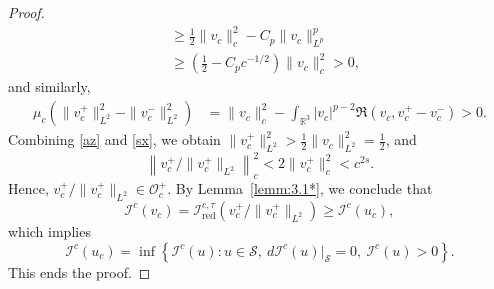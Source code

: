 \documentclass{amsart}
\theoremstyle{plain}
\theoremstyle{definition}
\theoremstyle{remark}
\numberwithin{equation}{section} \numberwithin{figure}{section}
\begin{document}
\begin{proof}
\begin{equation}
\begin{split}
              &\geq \frac{1}{2} \|v_c\|_c^2 - C_p \|v_c\|_{L^p}^p \\
              &\geq \left( \frac{1}{2} - C_p c^{-1/2} \right) \|v_c\|_c^2 > 0,
          \end{split}
      \end{equation}
      and similarly,
      \begin{equation}\label{sx}
          \begin{split}
              \mu_c \left( \|v_c^+\|_{L^2}^2 - \|v_c^-\|_{L^2}^2 \right) &= \|v_c\|_c^2 - \int_{\mathbb{R}^3} |v_c|^{p-2} \Re(v_c, v_c^+ - v_c^-) > 0.
          \end{split}
      \end{equation}
      Combining \eqref{az} and \eqref{sx}, we obtain \( \|v_c^+\|_{L^2}^2 > \frac{1}{2} \|v_c\|_{L^2}^2 = \frac{1}{2} \), and
      \[
      \left\| {v_c^+}/{\|v_c^+\|_{L^2}} \right\|_c^2 < 2 \|v_c^+\|_c^2 < c^{2s}.
      \]
      Hence, \( v_c^+ / \|v_c^+\|_{L^2} \in \mathcal{O}_c^+ \). By Lemma~\ref{lemm:3.1*}, we conclude that
      \[
      \mathcal{I}^c(v_c) = \mathcal{I}_{\mathrm{red}}^{c,\tau} \left( {v_c^+}/{\|v_c^+\|_{L^2}} \right) \geq \mathcal{I}^c(u_c),
      \]
      which implies
      \[
      \mathcal{I}^{c}(u_c) = \inf \left\{ \mathcal{I}^{c}(u) : u \in \mathcal{S},\ d\mathcal{I}^{c}(u)|_{\mathcal{S}} = 0,\ \mathcal{I}^{c}(u) > 0 \right\}.
      \]
      This ends the proof.
  \end{proof}
  
\end{document}
